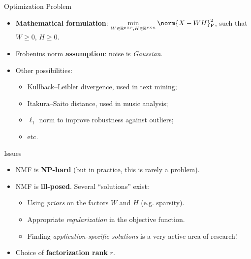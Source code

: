 \begin{frame}{Optimization Problem}
\begin{itemize}
\item<1-> \textbf{Mathematical formulation}: \(\displaystyle \min_{W \in \mathbb{R}^{p \times r}, H \in \mathbb{R}^{r \times n}} \norm{X - WH}^2_{\textnormal{F}}\), such that \(W \geqslant 0\), \(H \geqslant 0\).
\item<2-> Frobenius norm \textbf{assumption}: noise is \emph{Gaussian}.
\item<3-> Other possibilities:
\begin{itemize}
    \item Kullback--Leibler divergence, used in text mining;
    \item Itakura--Saito distance, used in music analysis;
    \item \(\ell_1\) norm to improve robustness against outliers;
    \item etc.
\end{itemize}
\end{itemize}
\end{frame}

\begin{frame}{Issues}
\begin{itemize}
\item<1-> NMF is \textbf{NP-hard} (but in practice, this is rarely a problem).
\item<2-> NMF is \textbf{ill-posed}. Several ``solutions'' exist:
\begin{itemize}
    \item Using \emph{priors} on the factors \(W\) and \(H\) (e.g. sparsity).
    \item Appropriate \emph{regularization} in the objective function.
    \item Finding \emph{application-specific solutions} is a very active area of research!
\end{itemize}
\item<3-> Choice of \textbf{factorization rank} \(r\).
\end{itemize}
\end{frame}